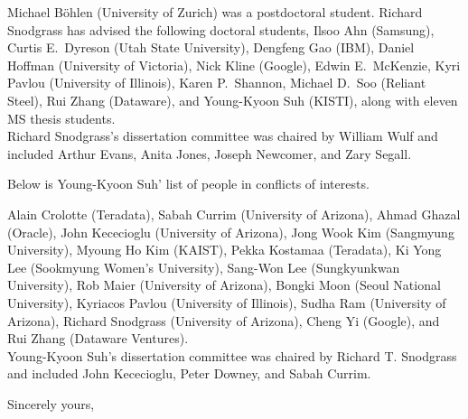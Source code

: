 \documentclass{letter} %
\begin{document}
\begin{letter}
Michael B\"{o}hlen
(University of Zurich) was a postdoctoral student. Richard Snodgrass has
advised the following doctoral students, Ilsoo Ahn (Samsung), Curtis
E.~Dyreson (Utah State University), Dengfeng Gao (IBM), Daniel Hoffman
(University of Victoria), Nick Kline (Google), Edwin E.~McKenzie, Kyri
Pavlou (University of Illinois), Karen P.~Shannon, Michael D.~Soo (Reliant
Steel), Rui Zhang (Dataware), and Young-Kyoon Suh (KISTI), along with eleven MS thesis students.\\

Richard Snodgrass's dissertation committee was chaired by William Wulf and
included Arthur Evans, Anita Jones, Joseph Newcomer, and Zary Segall.

Below is Young-Kyoon Suh' list of people in conflicts of interests.

Alain Crolotte (Teradata), 
Sabah Currim (University of Arizona), 
Ahmad Ghazal (Oracle),
John \hbox{Kececioglu} (University of Arizona), 
Jong Wook Kim (Sangmyung University),
Myoung Ho Kim (KAIST),
Pekka Kostamaa (Teradata),
Ki Yong Lee (Sookmyung Women's University),
Sang-Won Lee (Sungkyunkwan University),
Rob Maier (University of Arizona), 
Bongki Moon (Seoul National University),
Kyriacos Pavlou (University of Illinois),
Sudha Ram (University of Arizona),  
Richard Snodgrass (University of Arizona), 
Cheng Yi (Google), and 
Rui Zhang (Dataware Ventures).\\

Young-Kyoon Suh's dissertation committee was chaired by Richard T. Snodgrass and
included John \hbox{Kececioglu}, Peter Downey, and Sabah Currim.

\closing{Sincerely yours,} 

\end{letter}
 
\end{document}
